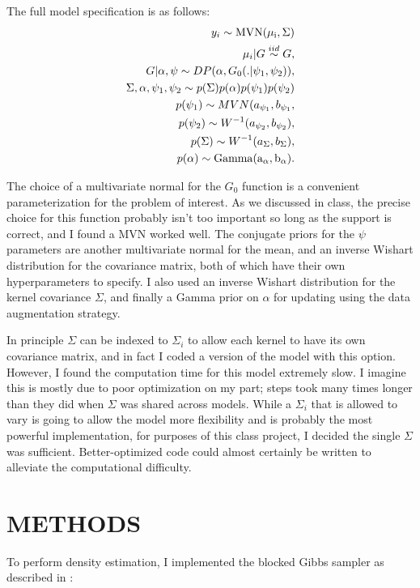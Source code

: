 \documentclass{article}
\begin{document}
The full model specification is as follows: 
\begin{eqnarray}
y_i \sim \rm{MVN}(\mu_i,\Sigma) \\
\mu_i | G \stackrel{iid}{\sim}G,\\
G | \alpha,\psi \sim DP(\alpha,G_0(.|\psi_1,\psi_2)), \\
\Sigma,\alpha,\psi_1,\psi_2 \sim p(\Sigma)p(\alpha)p(\psi_1)p(\psi_2)\\
p(\psi_1) \sim MVN (a_{\psi_1},b_{\psi_1},\\
p(\psi_2) \sim W^{-1}(a_{\psi_2},b_{\psi_2}),\\
p(\Sigma) \sim W^{-1}(a_{\Sigma},b_{\Sigma}),\\
p(\alpha) \sim \rm{Gamma}(a_\alpha,b_\alpha).
\end{eqnarray}

The choice of a multivariate normal for the $G_0$ function is a convenient parameterization for the problem of interest.
As we discussed in class, the precise choice for this function probably isn't too important so long as the support is correct,
and I found a MVN worked well. The conjugate priors for the $\psi$ parameters are another multivariate normal
for the mean, and an inverse Wishart distribution for the covariance matrix, both of which have their own hyperparameters
to specify. I also used an inverse Wishart distribution for the kernel covariance $\Sigma$, and finally a Gamma prior
on $\alpha$ for updating using the data augmentation strategy.

In principle $\Sigma$ can be indexed to $\Sigma_i$ to allow each kernel to have its own covariance matrix,
and in fact I coded a version of the model with this option. However, I found the computation time for this
model extremely slow. I imagine this is mostly due to poor optimization on my part; steps took many times longer
than they did when $\Sigma$ was shared across models. While a $\Sigma_i$ that is allowed to vary is going to allow the model
more flexibility and is probably the most powerful implementation, for purposes of this class project, I decided
the single $\Sigma$ was sufficient. Better-optimized code could almost certainly be written to alleviate the computational
difficulty.

\section{METHODS}
To perform density estimation, I implemented the blocked Gibbs sampler as described in \citealt{ishwaran2001}:
\end{document}
